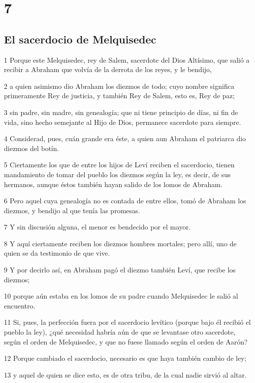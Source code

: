 \chapter{7}

\section*{El sacerdocio de Melquisedec}

\par 1 Porque este Melquisedec, rey de Salem, sacerdote del Dios Altísimo, que salió a recibir a Abraham que volvía de la derrota de los reyes, y le bendijo,
\par 2 a quien asimismo dio Abraham los diezmos de todo; cuyo nombre significa primeramente Rey de justicia, y también Rey de Salem, esto es, Rey de paz;
\par 3 sin padre, sin madre, sin genealogía; que ni tiene principio de días, ni fin de vida, sino hecho semejante al Hijo de Dios, permanece sacerdote para siempre.
\par 4 Considerad, pues, cuán grande era éste, a quien aun Abraham el patriarca dio diezmos del botín.
\par 5 Ciertamente los que de entre los hijos de Leví reciben el sacerdocio, tienen mandamiento de tomar del pueblo los diezmos según la ley, es decir, de sus hermanos, aunque éstos también hayan salido de los lomos de Abraham.
\par 6 Pero aquel cuya genealogía no es contada de entre ellos, tomó de Abraham los diezmos, y bendijo al que tenía las promesas.
\par 7 Y sin discusión alguna, el menor es bendecido por el mayor.
\par 8 Y aquí ciertamente reciben los diezmos hombres mortales; pero allí, uno de quien se da testimonio de que vive.
\par 9 Y por decirlo así, en Abraham pagó el diezmo también Leví, que recibe los diezmos;
\par 10 porque aún estaba en los lomos de su padre cuando Melquisedec le salió al encuentro.
\par 11 Si, pues, la perfección fuera por el sacerdocio levítico (porque bajo él recibió el pueblo la ley), ¿qué necesidad habría aún de que se levantase otro sacerdote, según el orden de Melquisedec, y que no fuese llamado según el orden de Aarón?
\par 12 Porque cambiado el sacerdocio, necesario es que haya también cambio de ley;
\par 13 y aquel de quien se dice esto, es de otra tribu, de la cual nadie sirvió al altar.
